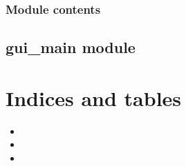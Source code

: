 \documentclass[letterpaper,12pt,english]{sphinxmanual}
\begin{document}
\subsection{Module contents}
\label{\detokenize{backend:module-contents}}
\sphinxstepscope


\section{gui\_main module}
\label{\detokenize{gui_main:gui-main-module}}\label{\detokenize{gui_main::doc}}

\chapter{Indices and tables}
\label{\detokenize{index:indices-and-tables}}\begin{itemize}
\item {} 
\sphinxAtStartPar
{}

\item {} 
\sphinxAtStartPar
{}

\item {} 
\sphinxAtStartPar
{}

\end{itemize}



\renewcommand{\indexname}{Index}
\printindex
\end{document}
